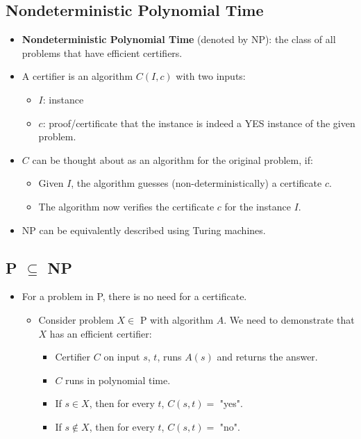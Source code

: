 \documentclass[12pt]{article}
\begin{document}
\subsection{Nondeterministic Polynomial Time}
\begin{itemize}
    \item \textbf{Nondeterministic Polynomial Time} (denoted by NP): the class of all problems that have efficient certifiers.
    \item A certifier is an algorithm $C(I, c)$ with two inputs:
    \begin{itemize}
        \item $I$: instance
        \item $c$: proof/certificate that the instance is indeed a YES instance of the given problem.
    \end{itemize}
    \item $C$ can be thought about as an algorithm for the original problem, if:
    \begin{itemize}
        \item Given $I$, the algorithm guesses (non-deterministically) a certificate $c$.
        \item The algorithm now verifies the certificate $c$ for the instance $I$.
    \end{itemize}
    \item NP can be equivalently described using Turing machines.
\end{itemize}

\subsection{P $\subseteq$ NP}
\begin{itemize}
    \item For a problem in P, there is no need for a certificate.
    \begin{itemize}
        \item Consider problem $X \in$ P with algorithm $A$. We need to demonstrate that $X$ has an efficient certifier:
        \begin{itemize}
            \item Certifier $C$ on input $s$, $t$, runs $A(s)$ and returns the answer.
            \item $C$ runs in polynomial time.
            \item If $s \in X$, then for every $t$, $C(s, t) =$ "yes".
            \item If $s \notin X$, then for every $t$, $C(s, t) =$ "no".
        \end{itemize}
    \end{itemize}
\end{itemize}
\end{document}
